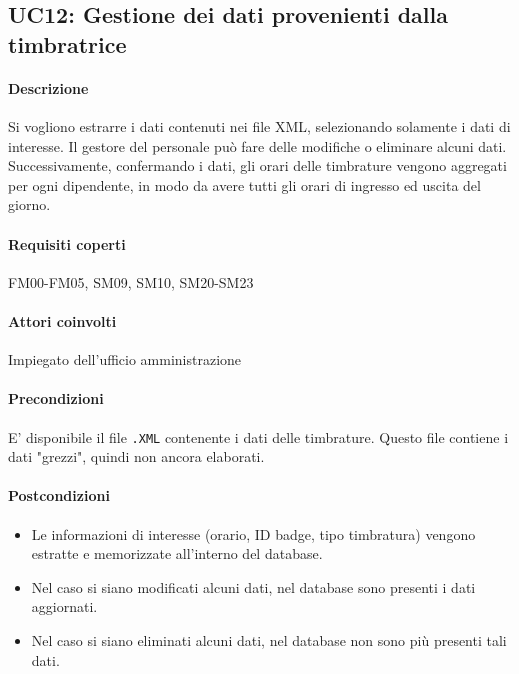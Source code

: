 \subsection{UC12: Gestione dei dati provenienti dalla timbratrice}
\paragraph{Descrizione}
Si vogliono estrarre i dati contenuti nei file XML, selezionando solamente i dati di interesse. Il gestore del personale può fare delle modifiche o eliminare alcuni dati. \\
Successivamente, confermando i dati, gli orari delle timbrature vengono aggregati per ogni dipendente, in modo da avere tutti gli orari di ingresso ed uscita del giorno.
\paragraph{Requisiti coperti}
FM00-FM05, SM09, SM10, SM20-SM23
\paragraph{Attori coinvolti}
Impiegato dell'ufficio amministrazione
\paragraph{Precondizioni}
E' disponibile il file \verb|.XML| contenente i dati delle timbrature. Questo file contiene i dati "grezzi", quindi non ancora elaborati.
\paragraph{Postcondizioni}
\begin{itemize}
	\item Le informazioni di interesse (orario, ID badge, tipo timbratura) vengono estratte e memorizzate all'interno del database.
	\item Nel caso si siano modificati alcuni dati, nel database sono presenti i dati aggiornati.
	\item Nel caso si siano eliminati alcuni dati, nel database non sono più presenti tali dati.
\end{itemize}
